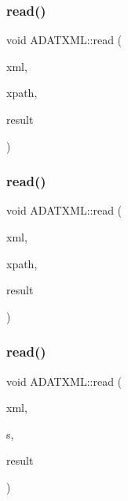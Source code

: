 \mbox{\label{group__io_ga28f3bc5eedbefea7d81064c339e72f97}} 
\subsubsection{\texorpdfstring{read()}{read()}\hspace{0.1cm}{\footnotesize\ttfamily [17/52]}}
{\footnotesize\ttfamily void A\+D\+A\+T\+X\+M\+L\+::read (\begin{DoxyParamCaption}\item[{\mbox{\hyperlink{classADATXML_1_1XMLReader}{X\+M\+L\+Reader}} \&}]{xml,  }\item[{const std\+::string \&}]{xpath,  }\item[{\mbox{\hyperlink{classXMLArray_1_1Array}{Array}}$<$ long int $>$ \&}]{result }\end{DoxyParamCaption})}

\mbox{\label{group__io_gae84bf39f198c8718403a15bc408a09a1}} 
\subsubsection{\texorpdfstring{read()}{read()}\hspace{0.1cm}{\footnotesize\ttfamily [18/52]}}
{\footnotesize\ttfamily void A\+D\+A\+T\+X\+M\+L\+::read (\begin{DoxyParamCaption}\item[{\mbox{\hyperlink{classADATXML_1_1XMLReader}{X\+M\+L\+Reader}} \&}]{xml,  }\item[{const std\+::string \&}]{xpath,  }\item[{\mbox{\hyperlink{classXMLArray_1_1Array}{Array}}$<$ unsigned long int $>$ \&}]{result }\end{DoxyParamCaption})}

\mbox{\label{group__io_ga9ad99522897be390bf165bf7f963acc8}} 
\subsubsection{\texorpdfstring{read()}{read()}\hspace{0.1cm}{\footnotesize\ttfamily [19/52]}}
{\footnotesize\ttfamily void A\+D\+A\+T\+X\+M\+L\+::read (\begin{DoxyParamCaption}\item[{\mbox{\hyperlink{classADATXML_1_1XMLReader}{X\+M\+L\+Reader}} \&}]{xml,  }\item[{const std\+::string \&}]{s,  }\item[{std\+::string \&}]{result }\end{DoxyParamCaption})}

